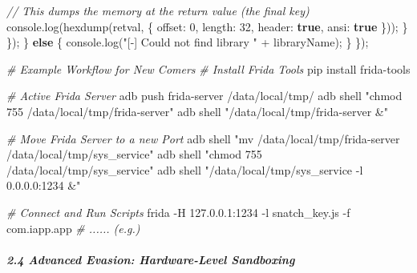 \documentclass[
]{article}
\newenvironment{Shaded}{}{}
\newcommand{\AttributeTok}[1]{\textcolor[rgb]{0.49,0.56,0.16}{#1}}
\newcommand{\BuiltInTok}[1]{\textcolor[rgb]{0.00,0.50,0.00}{#1}}
\newcommand{\CommentTok}[1]{\textcolor[rgb]{0.38,0.63,0.69}{\textit{#1}}}
\newcommand{\ControlFlowTok}[1]{\textcolor[rgb]{0.00,0.44,0.13}{\textbf{#1}}}
\newcommand{\DataTypeTok}[1]{\textcolor[rgb]{0.56,0.13,0.00}{#1}}
\newcommand{\DecValTok}[1]{\textcolor[rgb]{0.25,0.63,0.44}{#1}}
\newcommand{\ExtensionTok}[1]{#1}
\newcommand{\FunctionTok}[1]{\textcolor[rgb]{0.02,0.16,0.49}{#1}}
\newcommand{\KeywordTok}[1]{\textcolor[rgb]{0.00,0.44,0.13}{\textbf{#1}}}
\newcommand{\NormalTok}[1]{#1}
\newcommand{\OperatorTok}[1]{\textcolor[rgb]{0.40,0.40,0.40}{#1}}
\newcommand{\StringTok}[1]{\textcolor[rgb]{0.25,0.44,0.63}{#1}}
\begin{document}
\begin{Shaded}
\begin{Highlighting}[]
                \CommentTok{// This dumps the memory at the return value (the final key)}
                \BuiltInTok{console}\OperatorTok{.}\FunctionTok{log}\NormalTok{(}\FunctionTok{hexdump}\NormalTok{(retval}\OperatorTok{,}\NormalTok{ \{}
                    \DataTypeTok{offset}\OperatorTok{:} \DecValTok{0}\OperatorTok{,}
                    \DataTypeTok{length}\OperatorTok{:} \DecValTok{32}\OperatorTok{,}
                    \DataTypeTok{header}\OperatorTok{:} \KeywordTok{true}\OperatorTok{,}
                    \DataTypeTok{ansi}\OperatorTok{:} \KeywordTok{true}
\NormalTok{                \}))}\OperatorTok{;}
\NormalTok{            \}}
\NormalTok{        \})}\OperatorTok{;}
\NormalTok{    \} }\ControlFlowTok{else}\NormalTok{ \{}
        \BuiltInTok{console}\OperatorTok{.}\FunctionTok{log}\NormalTok{(}\StringTok{"[{-}] Could not find library "} \OperatorTok{+}\NormalTok{ libraryName)}\OperatorTok{;}
\NormalTok{    \}}
\NormalTok{\})}\OperatorTok{;}
\end{Highlighting}
\end{Shaded}

\begin{Shaded}
\begin{Highlighting}[]
\CommentTok{\# Example Workflow for New Comers}
\CommentTok{\# Install Frida Tools }
\ExtensionTok{pip}\NormalTok{ install frida{-}tools}

\CommentTok{\# Active Frida Server}
\ExtensionTok{adb}\NormalTok{ push frida{-}server /data/local/tmp/}
\ExtensionTok{adb}\NormalTok{ shell }\StringTok{"chmod 755 /data/local/tmp/frida{-}server"}
\ExtensionTok{adb}\NormalTok{ shell }\StringTok{"/data/local/tmp/frida{-}server \&"}

\CommentTok{\# Move Frida Server to a new Port}
\ExtensionTok{adb}\NormalTok{ shell }\StringTok{"mv /data/local/tmp/frida{-}server /data/local/tmp/sys\_service"}
\ExtensionTok{adb}\NormalTok{ shell }\StringTok{"chmod 755 /data/local/tmp/sys\_service"}
\ExtensionTok{adb}\NormalTok{ shell }\StringTok{"/data/local/tmp/sys\_service {-}l 0.0.0.0:1234 \&"}

\CommentTok{\# Connect and Run Scripts}
\ExtensionTok{frida} \AttributeTok{{-}H}\NormalTok{ 127.0.0.1:1234 }\AttributeTok{{-}l}\NormalTok{ snatch\_key.js }\AttributeTok{{-}f}\NormalTok{ com.iapp.app}
\CommentTok{\# ...... (e.g.)}
\end{Highlighting}
\end{Shaded}

\subparagraph{2.4 Advanced Evasion: Hardware-Level
Sandboxing}\label{24-advanced-evasion-hardware-level-sandboxing}
\end{document}
